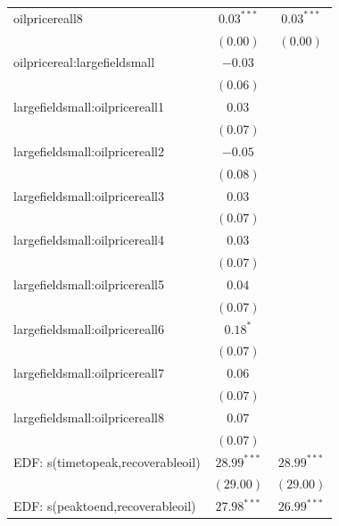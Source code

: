 \documentclass[11pt]{article}
\begin{document}
\begin{spacing}{1}
\begin{table}
\begin{center}
\begin{tabular}{l c c }
oilpricereall8                    & $0.03^{***}$     & $0.03^{***}$     \\
                                     & $(0.00)$         & $(0.00)$         \\
oilpricereal:largefieldsmall      & $-0.03$          &                  \\
                                     & $(0.06)$         &                  \\
largefieldsmall:oilpricereall1   & $0.03$           &                  \\
                                     & $(0.07)$         &                  \\
largefieldsmall:oilpricereall2   & $-0.05$          &                  \\
                                     & $(0.08)$         &                  \\
largefieldsmall:oilpricereall3   & $0.03$           &                  \\
                                     & $(0.07)$         &                  \\
largefieldsmall:oilpricereall4   & $0.03$           &                  \\
                                     & $(0.07)$         &                  \\
largefieldsmall:oilpricereall5   & $0.04$           &                  \\
                                     & $(0.07)$         &                  \\
largefieldsmall:oilpricereall6   & $0.18^{*}$       &                  \\
                                     & $(0.07)$         &                  \\
largefieldsmall:oilpricereall7   & $0.06$           &                  \\
                                     & $(0.07)$         &                  \\
largefieldsmall:oilpricereall8   & $0.07$           &                  \\
                                     & $(0.07)$         &                  \\
EDF: s(timetopeak,recoverableoil) & $28.99^{***}$    & $28.99^{***}$    \\
                                     & $(29.00)$        & $(29.00)$        \\
EDF: s(peaktoend,recoverableoil)  & $27.98^{***}$    & $26.99^{***}$    \\

\end{tabular}
\end{center}
\end{table}
\end{spacing}
\end{document}
